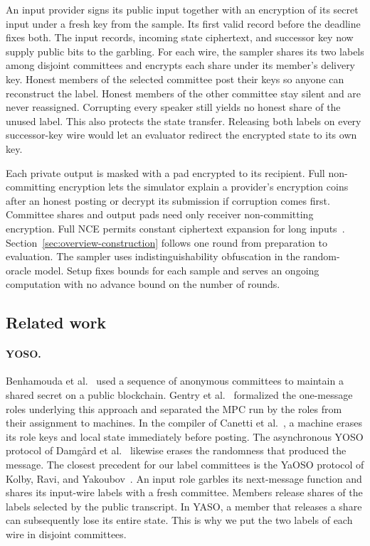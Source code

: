 An input provider signs its public input together with an encryption of
its secret input under a fresh key from the sample. Its first valid record
before the deadline fixes both. The input records, incoming state ciphertext,
and successor key now supply public bits to the garbling.
For each wire, the sampler shares its two labels among disjoint committees
and encrypts each share under its member's delivery key. Honest members of
the selected committee post their keys so anyone can reconstruct the
label. Honest members of the other committee stay silent and are never
reassigned. Corrupting every speaker still yields no honest share of the
unused label. This also protects the state transfer. Releasing both labels
on every successor-key wire would let an evaluator redirect the encrypted
state to its own key.

Each private output is masked with a pad encrypted to its recipient.
Full non-committing encryption lets the simulator explain a provider's
encryption coins after an honest posting or decrypt its submission if
corruption comes first. Committee shares and output pads need only
receiver non-committing encryption. Full NCE permits constant ciphertext
expansion for long inputs~\cite{BrakerskiEtAl2020ConstantNCE}.
Section~\ref{sec:overview-construction} follows one round from preparation
to evaluation. The sampler uses indistinguishability obfuscation in the
random-oracle model. Setup fixes bounds for each sample and serves an
ongoing computation with no advance bound on the number of rounds.

\subsection{Related work}
\label{sec:related-work}

\paragraph{YOSO.}
Benhamouda et al.~\cite{BenhamoudaEtAl2020BlockchainSecret} used a
sequence of anonymous committees to maintain a shared secret on a public
blockchain.  Gentry et al.~\cite{GentryEtAl2021YOSOFull} formalized the
one-message roles underlying this approach and separated the MPC run by
the roles from their assignment to machines.  In the compiler of
Canetti et al.~\cite{CanettiEtAl2023TamingYOSO}, a machine erases its
role keys and local state immediately before posting.  The asynchronous
YOSO protocol of Damg{\aa}rd et al.~\cite{DamgardEtAl2025AsyncYOSO}
likewise erases the randomness that produced the message.
The closest precedent for our label committees is the YaOSO protocol of
Kolby, Ravi, and Yakoubov~\cite{KolbyRaviYakoubov2024ConstantYOSO}.
An input role garbles its next-message function and shares its input-wire
labels with a fresh committee.  Members release shares of the labels
selected by the public transcript.  In YASO, a member that releases a
share can subsequently lose its entire state.  This is why we put the
two labels of each wire in disjoint committees.

